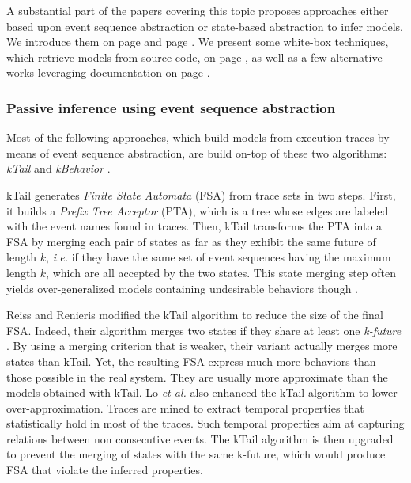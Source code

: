 A substantial part of the papers covering this topic proposes
approaches either based upon event sequence abstraction or
state-based abstraction to infer models. We introduce them on
page \pageref{sec:passive-fsa} and page \pageref{sec:passive-spec}.
We present some white-box techniques, which retrieve
models from source code, on page \pageref{sec:passive-white}, as
well as a few alternative works leveraging documentation on page
\pageref{sec:passive-others}.

\subsubsection{Passive inference using event sequence abstraction}
\label{sec:passive-fsa}

Most of the following approaches, which build models from
execution traces by means of event sequence abstraction, are
build on-top of these two algorithms: \textit{kTail}
\cite{5009015} and \textit{kBehavior} \cite{mariani2007dynamic}.

kTail generates \textit{Finite State Automata} (FSA) from trace
sets in two steps. First, it builds a \textit{Prefix Tree
Acceptor} (PTA), which is a tree whose edges are labeled with
the event names found in traces. Then, kTail transforms the PTA
into a FSA by merging each pair of states as far as they exhibit
the same future of length $k$, \emph{i.e.} if they have the same set of
event sequences having the maximum length $k$, which are all
accepted by the two states. This state merging step often yields
over-generalized models containing undesirable behaviors though
\cite{4023976}.

Reiss and Renieris modified the kTail algorithm to reduce the
size of the final FSA.  Indeed, their algorithm merges two states
if they share at least one \textit{k-future} \cite{919096}. By
using a merging criterion that is weaker, their variant actually
merges more states than kTail. Yet, the resulting FSA
express much more behaviors than those possible in the real
system. They are usually more approximate than the models
obtained with kTail. Lo \emph{et al.} \cite{Lo:2009:ASB:1595696.1595761}
also enhanced the kTail algorithm to lower over-approximation.
Traces are mined to extract temporal properties that
statistically hold in most of the traces. Such temporal
properties aim at capturing relations between non consecutive
events. The kTail algorithm is then upgraded to prevent the
merging of states with the same k-future, which would produce FSA
that violate the inferred properties.

